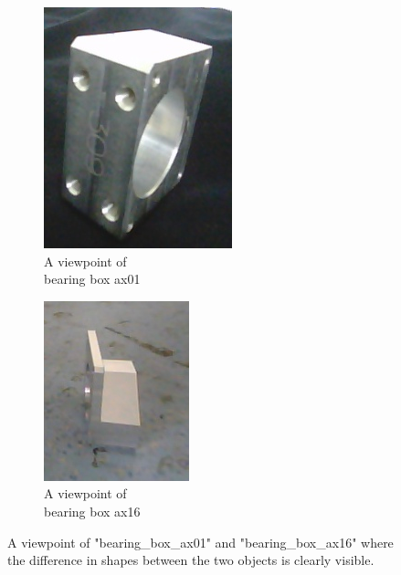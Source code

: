 \begin{itemize}
\begin{figure}[h]
	\centering
	\begin{subfigure}{.3\textwidth}
  		\centering
  		\includegraphics[width=.5\linewidth]{images/ax01_diff}
  		\caption{A viewpoint of \\bearing box ax01}
  		\label{Fig:sim1a}
	\end{subfigure}%
	\begin{subfigure}{.3\textwidth}
  		\centering
  		\includegraphics[width=.5\linewidth]{images/ax16_diff}
  		\caption{A viewpoint of \\bearing box ax16}
  		\label{Fig:sim1b}
	\end{subfigure}%
	\caption{A viewpoint of "bearing\_box\_ax01" and "bearing\_box\_ax16" where the difference in shapes between the two objects is clearly visible.}
	\label{Fig:sim1}
\end{figure}


\end{itemize}
